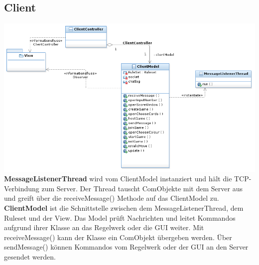 \documentclass{article}
\begin{document}
\subsection{Client}
\includegraphics[width=\textwidth]{Client}
\textbf{MessageListenerThread} wird vom ClientModel instanziert und hält die TCP-Verbindung zum Server. Der Thread tauscht ComObjekte mit dem Server aus und greift über die receiveMessage() Methode auf das ClientModel zu.
		\textbf{ClientModel} ist die Schnittstelle zwischen dem MessageListenerThread, dem Ruleset und der View. Das Model prüft Nachrichten und leitet Kommandos aufgrund ihrer Klasse an das Regelwerk oder die GUI weiter. Mit receiveMessage() kann der Klasse ein ComObjekt übergeben werden. Über sendMessage() können Kommandos vom Regelwerk oder der GUI an den Server gesendet werden.
\end{document}
